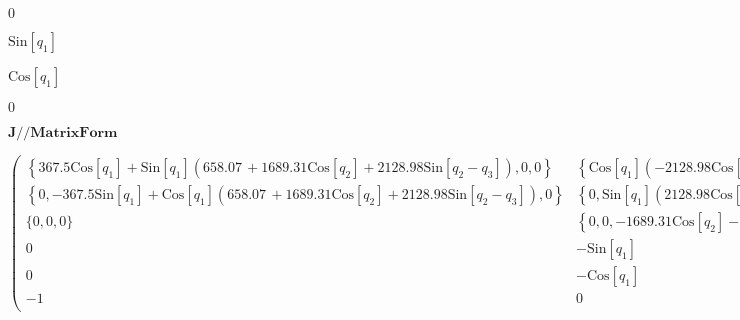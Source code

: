 \documentclass{article}
\begin{document}
\begin{doublespace}
\noindent\(0\)
\end{doublespace}

\begin{doublespace}
\noindent\(\text{Sin}\left[q_1\right]\)
\end{doublespace}

\begin{doublespace}
\noindent\(\text{Cos}\left[q_1\right]\)
\end{doublespace}

\begin{doublespace}
\noindent\(0\)
\end{doublespace}

\begin{doublespace}
\noindent\(\pmb{J\text{//}\text{MatrixForm}}\)
\end{doublespace}

\begin{doublespace}
\noindent\(\left(
\begin{array}{ccc}
 \left\{367.5 \text{Cos}\left[q_1\right]+\text{Sin}\left[q_1\right] \left(658.07\, +1689.31 \text{Cos}\left[q_2\right]+2128.98 \text{Sin}\left[q_2-q_3\right]\right),0,0\right\}
& \left\{\text{Cos}\left[q_1\right] \left(-2128.98 \text{Cos}\left[q_2-q_3\right]+1689.31 \text{Sin}\left[q_2\right]\right),0,0\right\} & \left\{2128.98
\text{Cos}\left[q_1\right] \text{Cos}\left[q_2-q_3\right],0,0\right\} \\
 \left\{0,-367.5 \text{Sin}\left[q_1\right]+\text{Cos}\left[q_1\right] \left(658.07\, +1689.31 \text{Cos}\left[q_2\right]+2128.98 \text{Sin}\left[q_2-q_3\right]\right),0\right\}
& \left\{0,\text{Sin}\left[q_1\right] \left(2128.98 \text{Cos}\left[q_2-q_3\right]-1689.31 \text{Sin}\left[q_2\right]\right),0\right\} & \left\{0,-2128.98
\text{Cos}\left[q_2-q_3\right] \text{Sin}\left[q_1\right],0\right\} \\
 \{0,0,0\} & \left\{0,0,-1689.31 \text{Cos}\left[q_2\right]-2128.98 \text{Sin}\left[q_2-q_3\right]\right\} & \left\{0,-2128.98 \text{Cos}\left[q_2-q_3\right]
\text{Sin}\left[q_1\right],0\right\} \\
 0 & -\text{Sin}\left[q_1\right] & \text{Sin}\left[q_1\right] \\
 0 & -\text{Cos}\left[q_1\right] & \text{Cos}\left[q_1\right] \\
 -1 & 0 & 0 \\
\end{array}
\right)\)
\end{doublespace}
\end{document}
